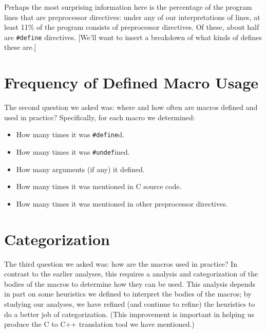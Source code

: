 Perhaps the most surprising information here is the percentage of the
program lines that are preprocessor directives: under any of our
interpretations of lines, at least 11\% of the program consists of
preprocessor directives.  Of these, about half are \verb+#define+
directives.  [We'll want to insert a breakdown of what kinds of
defines these are.]

\section{Frequency of Defined Macro Usage}\label{sec:usage}

The second question we asked was: where and how often are macros
defined and used in practice?  Specifically, for each macro we
determined:
\begin{itemize}

\item How many times it was \verb+#define+d.
\item How many times it was \verb+#undef+ined.
\item How many arguments (if any) it defined.
\item How many times it was mentioned in C source code.
\item How many times it was mentioned in other preprocessor
directives.

\end{itemize}

\section{Categorization}\label{sec:categorization}

The third question we asked was: how are the macros used in practice?
In contrast to the earlier analyses, this requires a analysis and
categorization of the bodies of the macros to determine how they can
be used.  This analysis depends in part on some heuristics we defined
to interpret the bodies of the macros; by studying our analyses, we
have refined (and continue to refine) the heuristics to do a better
job of categorization.  (This improvement is important in helping us
produce the C to C++ translation tool we have mentioned.)

